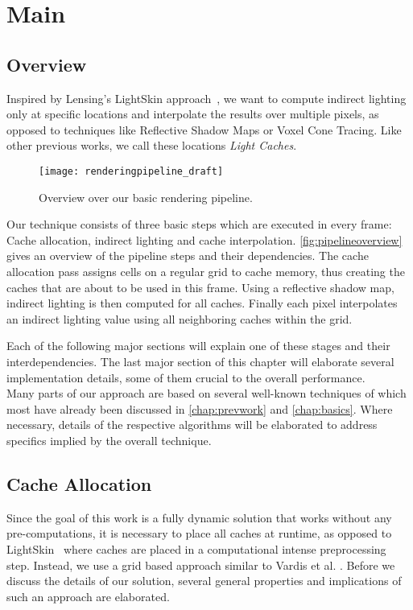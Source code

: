 \documentclass[thesis.tex]{subfiles}
\begin{document}
\chapter{Main}\label{chap:basics}

\section{Overview}
Inspired by Lensing's LightSkin approach~\cite{bib:LightskinPaper}, we want to compute indirect lighting only at specific locations and interpolate the results over multiple pixels, as opposed to techniques like Reflective Shadow Maps or Voxel Cone Tracing.
Like other previous works, we call these locations \emph{Light Caches}.

\begin{figure}[h]
	\centering
	\texttt{[image: renderingpipeline\_draft]}
	\caption{Overview over our basic rendering pipeline.}
	\label{fig:pipelineoverview}
\end{figure} 
Our technique consists of three basic steps which are executed in every frame: Cache allocation, indirect lighting and cache interpolation.
\autoref{fig:pipelineoverview} gives an overview of the pipeline steps and their dependencies.
The cache allocation pass assigns cells on a regular grid to cache memory, thus creating the caches that are about to be used in this frame.
Using a reflective shadow map, indirect lighting is then computed for all caches.
Finally each pixel interpolates an indirect lighting value using all neighboring caches within the grid.

Each of the following major sections will explain one of these stages and their interdependencies.
The last major section of this chapter will elaborate several implementation details, some of them crucial to the overall performance.\\
Many parts of our approach are based on several well-known techniques of which most have already been discussed in \autoref{chap:prevwork} and \autoref{chap:basics}.
Where necessary, details of the respective algorithms will be elaborated to address specifics implied by the overall technique.

\section{Cache Allocation}
Since the goal of this work is a fully dynamic solution that works without any pre-computations, it is necessary to place all caches at runtime, as opposed to LightSkin~\cite{bib:LightskinPaper} where caches are placed in a computational intense preprocessing step.
Instead, we use a grid based approach similar to Vardis et al. \cite{bib:radiancecachechromaticcompression}.
Before we discuss the details of our solution, several general properties and implications of such an approach are elaborated.
\end{document}
